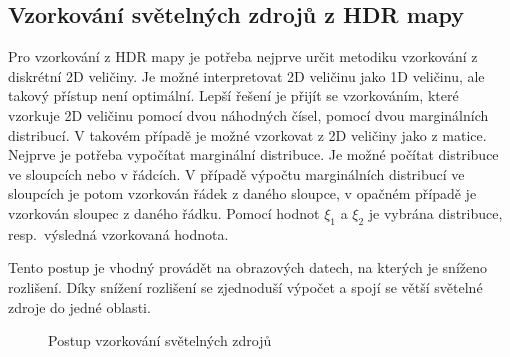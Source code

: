 \documentclass[czech,master]{diploma}
\newcommand{\randU}{\xi_{1}}
\newcommand{\randV}{\xi_{2}}
\begin{document}
\subsection{Vzorkování světelných zdrojů z HDR mapy}
Pro vzorkování z HDR mapy je potřeba nejprve určit metodiku vzorkování z diskrétní 2D veličiny. Je možné interpretovat 2D veličinu jako 1D veličinu, ale takový přístup není optimální. Lepší řešení je přijít se vzorkováním, které vzorkuje 2D veličinu pomocí dvou náhodných čísel, pomocí dvou marginálních distribucí. V takovém případě je možné vzorkovat z 2D veličiny jako z matice. Nejprve je potřeba vypočítat marginální distribuce. Je možné počítat distribuce ve sloupcích nebo v řádcích. V případě výpočtu marginálních distribucí ve sloupcích je potom vzorkován řádek z daného sloupce, v opačném případě je vzorkován sloupec z daného řádku. Pomocí hodnot \(\randU\) a \(\randV\) je vybrána distribuce, resp.\ výsledná vzorkovaná hodnota.~\cite{PHARR2017747}\par
Tento postup je vhodný provádět na obrazových datech, na kterých je sníženo rozlišení. Díky snížení rozlišení se zjednoduší výpočet a spojí se větší světelné zdroje do jedné oblasti.


\begin{figure}[ht]%
  \centering
  \qquad
  \caption[Postup vzorkování světelných zdrojů]{Postup vzorkování světelných zdrojů~\cite{PHARR2017747}}%
  \label{fig:lightsSampling}%
\end{figure}
\end{document}
